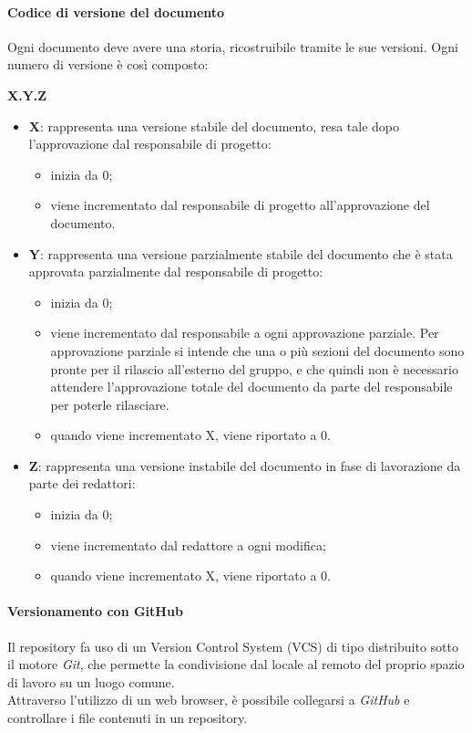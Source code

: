 			\paragraph{Codice di versione del documento}
			Ogni documento deve avere una storia, ricostruibile tramite le sue versioni. Ogni numero di versione è così composto:\\
			\centerline{\textbf{X.Y.Z}}
			\begin{itemize}
			\item \textbf{X}: rappresenta una versione stabile del documento, resa tale dopo l'approvazione dal responsabile di progetto:
				\begin{itemize}
		   			\item inizia da 0;
		   			\item viene incrementato dal responsabile di progetto all'approvazione del documento.
		  		\end{itemize}
		  	\item \textbf{Y}: rappresenta una versione parzialmente stabile del documento che è stata approvata parzialmente dal responsabile di progetto:
		  		\begin{itemize}
		   			\item inizia da 0;
		   			\item viene incrementato dal responsabile a ogni approvazione parziale. Per approvazione parziale si intende che una o più sezioni del documento sono pronte per il rilascio all'esterno del gruppo, e che quindi non è 								necessario attendere l'approvazione totale del documento da parte del responsabile per poterle rilasciare.
		   			\item quando viene incrementato X, viene riportato a 0.
		   		\end{itemize}
		   	\item \textbf{Z}: rappresenta una versione instabile del documento in fase di lavorazione da parte dei redattori:
		   		\begin{itemize}
		   			\item inizia da 0;
		   			\item viene incrementato dal redattore a ogni modifica; 
		   			\item quando viene incrementato X, viene riportato a 0.
		   		\end{itemize}
			\end{itemize}
			
			\paragraph{Versionamento con GitHub}
	Il repository fa uso di un Version Control System (VCS) di tipo distribuito sotto il motore \textit{Git}, che permette la condivisione dal locale al remoto del proprio spazio di lavoro su un luogo comune.\\
		Attraverso l'utilizzo di un web browser, è possibile collegarsi a \textit{GitHub} e controllare i file contenuti in un repository. 

